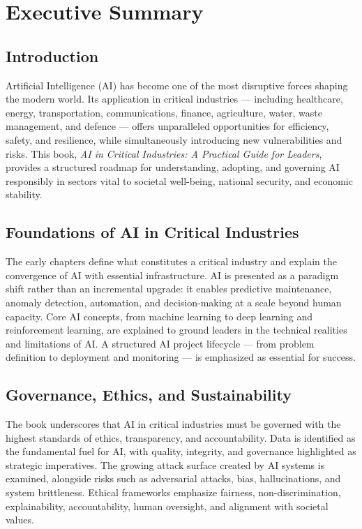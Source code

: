 \chapter{Executive Summary}
\label{chap:executive_summary}

\section*{Introduction}
Artificial Intelligence (AI) has become one of the most disruptive forces shaping the modern world. 
Its application in critical industries --- including healthcare, energy, transportation, communications, finance, agriculture, water, waste management, and defence --- 
offers unparalleled opportunities for efficiency, safety, and resilience, while simultaneously introducing new vulnerabilities and risks. 
This book, \emph{AI in Critical Industries: A Practical Guide for Leaders}, provides a structured roadmap for understanding, adopting, 
and governing AI responsibly in sectors vital to societal well-being, national security, and economic stability. 

\section*{Foundations of AI in Critical Industries}
The early chapters define what constitutes a critical industry and explain the convergence of AI with essential infrastructure. 
AI is presented as a paradigm shift rather than an incremental upgrade: it enables predictive maintenance, anomaly detection, 
automation, and decision-making at a scale beyond human capacity. Core AI concepts, from machine learning to deep learning and 
reinforcement learning, are explained to ground leaders in the technical realities and limitations of AI. A structured AI project 
lifecycle --- from problem definition to deployment and monitoring --- is emphasized as essential for success.

\section*{Governance, Ethics, and Sustainability}
The book underscores that AI in critical industries must be governed with the highest standards of ethics, transparency, and accountability. 
Data is identified as the fundamental fuel for AI, with quality, integrity, and governance highlighted as strategic imperatives. 
The growing attack surface created by AI systems is examined, alongside risks such as adversarial attacks, bias, hallucinations, 
and system brittleness. Ethical frameworks emphasize fairness, non-discrimination, explainability, accountability, human oversight, 
and alignment with societal values. 

